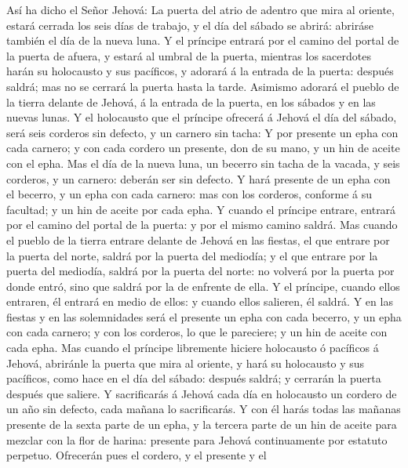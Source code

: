  Así ha dicho el Señor Jehová: La puerta del atrio de
adentro que mira al oriente, estará cerrada los seis días de trabajo, y
el día del sábado se abrirá: abriráse también el día de la nueva luna.
 Y el príncipe entrará por el camino del portal de la
puerta de afuera, y estará al umbral de la puerta, mientras los
sacerdotes harán su holocausto y sus pacíficos, y adorará á la entrada
de la puerta: después saldrá; mas no se cerrará la puerta hasta la
tarde.  Asimismo adorará el pueblo de la tierra delante de
Jehová, á la entrada de la puerta, en los sábados y en las nuevas lunas.
 Y el holocausto que el príncipe ofrecerá á Jehová el día
del sábado, será seis corderos sin defecto, y un carnero sin tacha:
 Y por presente un epha con cada carnero; y con cada
cordero un presente, don de su mano, y un hin de aceite con el epha.
 Mas el día de la nueva luna, un becerro sin tacha de la
vacada, y seis corderos, y un carnero: deberán ser sin defecto.
 Y hará presente de un epha con el becerro, y un epha con
cada carnero: mas con los corderos, conforme á su facultad; y un hin de
aceite por cada epha.  Y cuando el príncipe entrare,
entrará por el camino del portal de la puerta: y por el mismo camino
saldrá.  Mas cuando el pueblo de la tierra entrare delante
de Jehová en las fiestas, el que entrare por la puerta del norte, saldrá
por la puerta del mediodía; y el que entrare por la puerta del mediodía,
saldrá por la puerta del norte: no volverá por la puerta por donde
entró, sino que saldrá por la de enfrente de ella.  Y el
príncipe, cuando ellos entraren, él entrará en medio de ellos: y cuando
ellos salieren, él saldrá.  Y en las fiestas y en las
solemnidades será el presente un epha con cada becerro, y un epha con
cada carnero; y con los corderos, lo que le pareciere; y un hin de
aceite con cada epha.  Mas cuando el príncipe libremente
hiciere holocausto ó pacíficos á Jehová, abriránle la puerta que mira al
oriente, y hará su holocausto y sus pacíficos, como hace en el día del
sábado: después saldrá; y cerrarán la puerta después que saliere.
 Y sacrificarás á Jehová cada día en holocausto un
cordero de un año sin defecto, cada mañana lo sacrificarás.
 Y con él harás todas las mañanas presente de la sexta
parte de un epha, y la tercera parte de un hin de aceite para mezclar
con la flor de harina: presente para Jehová continuamente por estatuto
perpetuo.  Ofrecerán pues el cordero, y el presente y el
